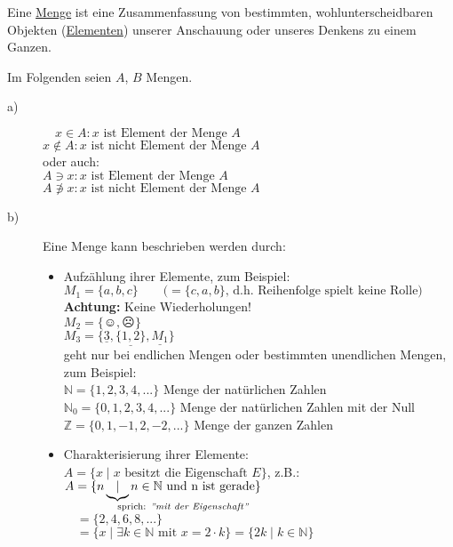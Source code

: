 \documentclass[a4paper, 12pt, twoside] {article}
\begin{document}
Eine \underline{Menge} ist eine Zusammenfassung von bestimmten, wohlunterscheidbaren Objekten (\underline{Elementen}) unserer Anschauung oder unseres Denkens zu einem Ganzen.

Im Folgenden seien $A$, $B$ Mengen.

\begin{description}
\item[a)] 
	$\quad x \in A : x \text{ ist Element der Menge } A$ \\
	$x \notin A: x \text{ ist nicht Element der Menge } A$ \\
	oder auch: \\
	$A \ni x : x \text{ ist Element der Menge } A$ \\
	$A \not \ni x: x \text{ ist nicht Element der Menge } A$
\item[b)]
	Eine Menge kann beschrieben werden durch:
	\begin{itemize}
		\item Aufzählung ihrer Elemente, zum Beispiel: \\
		$M_1 = \{a,b,c\} \qquad \text{(}=\{c,a,b\} \text{, d.h. Reihenfolge spielt keine Rolle)}$ \\
		\textbf{Achtung:} Keine Wiederholungen! \\
		$M_2 = \{\smiley,\frownie\}$ \\
		$M_3 = \{ \underline{3}, \underline{\{1,2\}}, \underline{M_1}\}$ \\
		geht nur bei endlichen Mengen oder bestimmten unendlichen Mengen, zum Beispiel: \\
		$\mathbb{N} = \{1,2,3,4,...\}$ Menge der natürlichen Zahlen \\
		$\mathbb{N}_0 = \{0, 1,2,3,4,...\}$ Menge der natürlichen Zahlen mit der Null \\
		$\mathbb{Z} = \{0,1,-1,2,-2,...\}$ Menge der ganzen Zahlen

		\item Charakterisierung ihrer Elemente: \\
		$A = \{x \mid x \text{ besitzt die Eigenschaft } E\}$, z.B.:\\ %
		$A = \{n \underbrace{\mid}_{\mathrlap{\text{sprich: \textit{''mit der Eigenschaft''}}}} n \in \mathbb{N} \text{ und n ist gerade}\}$\\
		$\quad = \{2,4,6,8,...\}$ \\
		$\quad = \{ x \mid \exists k \in \mathbb{N} \text{ mit } x = 2 \cdot k\} = \{2k \mid k \in \mathbb{N}\}$ \\
		

\end{itemize}
\end{description}
\end{document}
